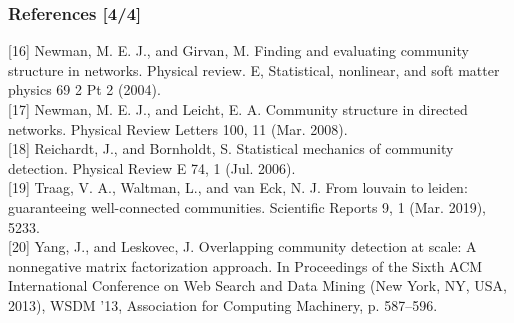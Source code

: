 \documentclass{beamer}
\begin{document}
\begin{frame}
    \frametitle{References [4/4]}

    [16] Newman, M. E. J., and Girvan, M. Finding and
    evaluating community structure in networks. Physical
    review. E, Statistical, nonlinear, and soft matter physics
    69 2 Pt 2 (2004). \\

    [17] Newman, M. E. J., and Leicht, E. A. Community
    structure in directed networks. Physical Review Letters
    100, 11 (Mar. 2008). \\

    [18] Reichardt, J., and Bornholdt, S. Statistical
    mechanics of community detection. Physical Review E
    74, 1 (Jul. 2006). \\

    [19] Traag, V. A., Waltman, L., and van Eck, N. J.
    From louvain to leiden: guaranteeing well-connected
    communities. Scientific Reports 9, 1 (Mar. 2019), 5233. \\

    [20] Yang, J., and Leskovec, J. Overlapping community
    detection at scale: A nonnegative matrix factorization
    approach. In Proceedings of the Sixth ACM International
    Conference on Web Search and Data Mining (New
    York, NY, USA, 2013), WSDM ’13, Association for
    Computing Machinery, p. 587–596.

\end{frame}
\end{document}
